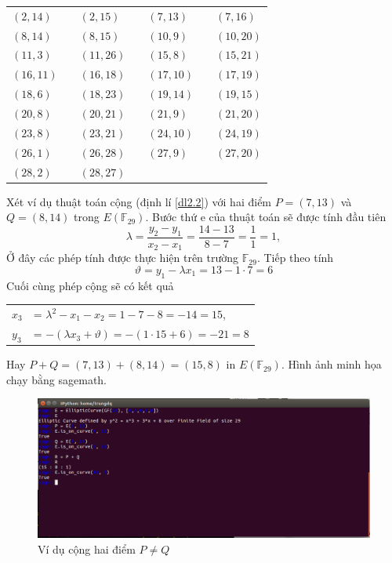 \documentclass[a4paper,12pt]{report}
\begin{document}
\begin{center}
\begin{tabular}{lllllll}
$(2, 14)$&  & $(2, 15)$&  & $(7, 13)$&  & $(7, 16)$ \\
$(8, 14)$&  & $(8, 15)$&  & $(10, 9)$&  & $(10, 20)$ \\ 
$(11, 3)$&  & $(11, 26)$&  & $(15, 8)$&  & $(15, 21)$ \\
$(16, 11)$&  & $(16, 18)$&  & $(17, 10)$&  & $(17, 19)$ \\
$(18, 6)$&  & $(18, 23)$&  & $(19, 14)$&  & $(19, 15)$ \\
$(20, 8)$&  & $(20, 21)$&  & $(21, 9)$&  & $(21, 20)$ \\
$(23, 8)$&  & $(23, 21)$&  & $(24, 10)$&  & $(24, 19)$ \\
$(26, 1)$&  & $(26, 28)$&  & $(27, 9)$&  & $(27, 20)$ \\
$(28, 2)$&  & $(28, 27)$ \\
\end{tabular}
\end{center}
Xét ví dụ thuật toán cộng (định lí \ref{dl2.2}) với hai điểm $P = (7, 13)$ và $Q = (8, 14)$ trong $E(\mathbb{F}_{29})$. Bước thứ e của thuật toán sẽ được tính đầu tiên
\begin{displaymath}
\lambda = \frac{y_2 - y_1}{x_2 - x_1} = \frac{14 - 13}{8 - 7} = \frac{1}{1} = 1,
\end{displaymath}
Ở đây các phép tính được thực hiện trên trường $\mathbb{F}_{29}$. Tiếp theo tính 
\begin{displaymath}
\vartheta = y_1 - \lambda x_1 = 13 - 1\cdot 7 = 6
\end{displaymath}
Cuối cùng phép cộng sẽ có kết quả
\begin{center}
\begin{tabular}{ll}
$x_3$ & = $\lambda^2 - x_1 - x_2 = 1 - 7 - 8 = -14 = 15$, \\
$y_3$ & = $-(\lambda x_3 + \vartheta) = -(1\cdot15 + 6) = -21 = 8$
\end{tabular}
\end{center}
Hay $P + Q = (7, 13) + (8, 14) = (15, 8)$ in  $E(\mathbb{F}_{29})$. Hình ảnh minh họa chạy bằng sagemath.
\begin{center}
\begin{figure}[H]
\includegraphics[width=0.9\linewidth]{../im17.png}
\caption{Ví dụ cộng hai điểm $P \neq Q$}
\end{figure}
\end{center}
\end{document}
